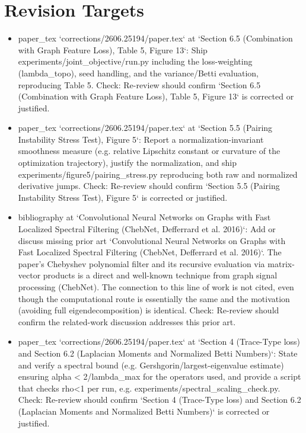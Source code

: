 \documentclass[11pt]{article}
\begin{document}
\section*{Revision Targets}
\begin{itemize}[leftmargin=*]
  \item [open] paper\_tex `corrections/2606.25194/paper.tex` at `Section 6.5 (Combination with Graph Feature Loss), Table 5, Figure 13`: Ship experiments/joint\_objective/run.py including the loss-weighting (lambda\_topo), seed handling, and the variance/Betti evaluation, reproducing Table 5. Check: Re-review should confirm `Section 6.5 (Combination with Graph Feature Loss), Table 5, Figure 13` is corrected or justified.
  \item [open] paper\_tex `corrections/2606.25194/paper.tex` at `Section 5.5 (Pairing Instability Stress Test), Figure 5`: Report a normalization-invariant smoothness measure (e.g. relative Lipschitz constant or curvature of the optimization trajectory), justify the normalization, and ship experiments/figure5/pairing\_stress.py reproducing both raw and normalized derivative jumps. Check: Re-review should confirm `Section 5.5 (Pairing Instability Stress Test), Figure 5` is corrected or justified.
  \item [open] bibliography at `Convolutional Neural Networks on Graphs with Fast Localized Spectral Filtering (ChebNet, Defferrard et al. 2016)`: Add or discuss missing prior art `Convolutional Neural Networks on Graphs with Fast Localized Spectral Filtering (ChebNet, Defferrard et al. 2016)`. The paper's Chebyshev polynomial filter and its recursive evaluation via matrix-vector products is a direct and well-known technique from graph signal processing (ChebNet). The connection to this line of work is not cited, even though the computational route is essentially the same and the motivation (avoiding full eigendecomposition) is identical. Check: Re-review should confirm the related-work discussion addresses this prior art.
  \item [open] paper\_tex `corrections/2606.25194/paper.tex` at `Section 4 (Trace-Type loss) and Section 6.2 (Laplacian Moments and Normalized Betti Numbers)`: State and verify a spectral bound (e.g. Gershgorin/largest-eigenvalue estimate) ensuring alpha < 2/lambda\_max for the operators used, and provide a script that checks rho<1 per run, e.g. experiments/spectral\_scaling\_check.py. Check: Re-review should confirm `Section 4 (Trace-Type loss) and Section 6.2 (Laplacian Moments and Normalized Betti Numbers)` is corrected or justified.

\end{itemize}
\end{document}
